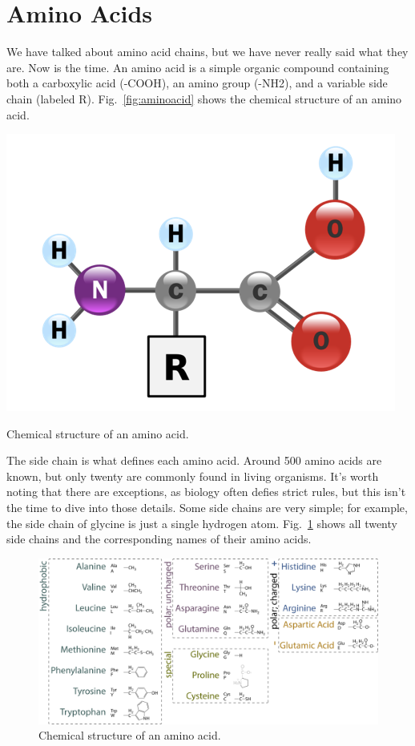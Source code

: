 \section{Amino Acids}

We have talked about amino acid chains, but we have never really said what they are. Now is the time. An amino acid is a simple organic compound containing both a carboxylic acid (-COOH), an amino group (-NH2), and a variable side chain (labeled R). Fig.~\ref{fig:aminoacid} shows the chemical structure of an amino acid.

\begin{marginfigure}
    \includegraphics{figs/molbiol/aminoacid.png}
    \caption[6pt]{Chemical structure of an amino acid.}
    \label{fig:aminoacid}
\end{marginfigure}

The side chain is what defines each amino acid. Around 500 amino acids are known, but only twenty are commonly found in living organisms. It's worth noting that there are exceptions, as biology often defies strict rules, but this isn't the time to dive into those details. Some side chains are very simple; for example, the side chain of glycine is just a single hydrogen atom. Fig.~\ref{fig:aminoacids} shows all twenty side chains and the corresponding names of their amino acids.

\begin{figure}
    \includegraphics{figs/molbiol/aminoacids.png}
    \caption[6pt]{Chemical structure of an amino acid.}
    \label{fig:aminoacids}
\end{figure}

